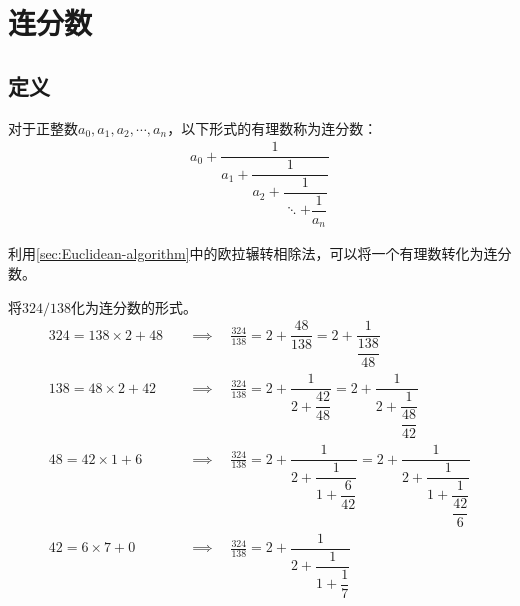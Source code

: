 
\chapter{连分数}
\label{chap:continued-fraction}

\section{定义}
\label{sec:definition-of-continued-fraction}

\begin{definition}
  对于正整数$a_0, a_1, a_2, \cdots, a_n$，以下形式的有理数称为连分数：
  \begin{align*}
    a_0 + \dfrac1{a_1 + \dfrac1{a_2 + \dfrac1{\ddots + \dfrac1{a_n}}}}
  \end{align*}
\end{definition}

利用\ref{sec:Euclidean-algorithm}中的欧拉辗转相除法，可以将一个有理数转化为连分数。

\begin{example}
  将$324/138$化为连分数的形式。
  \begin{align*}
    324 = 138\times2 + 48 &\quad\implies\quad \frac{324}{138} = 2 + \dfrac{48}{138} = 2 + \dfrac1{\dfrac{138}{48}}\\
    138 = 48\times 2 + 42 &\quad\implies\quad \frac{324}{138} = 2 + \dfrac{1}{2 + \dfrac{42}{48}} = 2 + \dfrac{1}{2 + \dfrac1{\dfrac{48}{42}}}\\
    48 = 42\times1 + 6 & \quad\implies\quad \frac{324}{138} = 2 + \dfrac{1}{2 + \dfrac1{1 + \dfrac{6}{42}}} =  2 + \dfrac{1}{2 + \dfrac1{1 + \dfrac1{\dfrac{42}{6}}}}\\
    42 = 6\times7 + 0 &  \quad\implies\quad \frac{324}{138} = 2 + \dfrac{1}{2 + \dfrac1{1 + \dfrac1{7}}}
  \end{align*}
\end{example}
